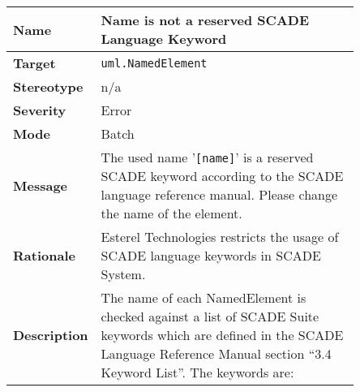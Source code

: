\documentclass{template/openetcs_article}
\begin{document}
\begin{longtable}{|l||>{\raggedright}p{0.85\linewidth}|}
  \hline
  \textbf{Name}        &  Name is not a reserved SCADE Language Keyword \tabularnewline \hline
  \textbf{Target}      &  \texttt{uml.NamedElement} \tabularnewline \hline
  \textbf{Stereotype}  &  n/a \tabularnewline \hline
  \textbf{Severity}    &  Error \tabularnewline \hline
  \textbf{Mode}        &  Batch \tabularnewline \hline
  \textbf{Message}     &  The used name '\texttt{[name]}' is a reserved SCADE keyword according to 
                          the SCADE language reference manual. Please change the name of the element. \tabularnewline \hline
  \textbf{Rationale}   &  Esterel Technologies restricts the usage of SCADE language keywords 
                          in SCADE System.  \tabularnewline \hline
  \textbf{Description} &  The name of each NamedElement is checked against a list of SCADE Suite 
                          keywords which are defined in the SCADE Language Reference Manual section 
                          ``3.4 Keyword List''. The keywords are:


\end{longtable}
\end{document}
